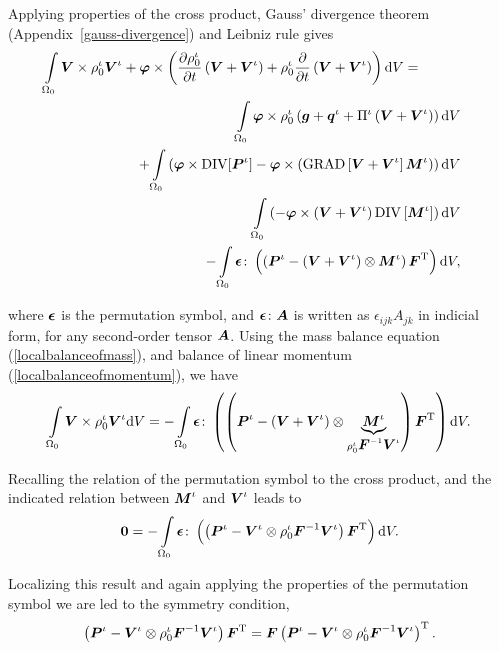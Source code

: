 \noindent Applying properties of the cross product, Gauss' divergence 
theorem (Appendix~\ref{gauss-divergence}) and Leibniz rule gives
\begin{eqnarray}
\int\limits_{\Omega_0}\mbox{\boldmath$ V$}\times\rho^\iota_0\mbox{\boldmath$ V$}^\iota +
\mbox{\boldmath$\varphi$}\times \left(\frac{\partial\rho^\iota_0}{\partial
t}\left(\mbox{\boldmath$ V$}+\mbox{\boldmath$ V$}^\iota\right)+ \rho^\iota_0\frac{\partial}{\partial
t}\left(\mbox{\boldmath$ V$}+\mbox{\boldmath$ V$}^\iota\right)\right)\mathrm{d}V =\qquad\quad& &\nonumber\\
\int\limits_{\Omega_0}\mbox{\boldmath$\varphi$}\times\rho^\iota_0
\left(\mbox{\boldmath$ g$}+\mbox{\boldmath$ q$}^\iota+\Pi^\iota\left(\mbox{\boldmath$ V$}+\mbox{\boldmath$ V$}^\iota\right)\right)\mathrm{d}V&
&\nonumber\\ 
 +
\int\limits_{\Omega_0}\left(\mbox{\boldmath$\varphi$}\times\mathrm{DIV}[\mbox{\boldmath$ P$}^\iota] -
\mbox{\boldmath$\varphi$}\times\left(\mathrm{GRAD}
\left[\mbox{\boldmath$ V$}+\mbox{\boldmath$ V$}^\iota\right]\mbox{\boldmath$ M$}^\iota\right)\right)\mathrm{d}V &
&\nonumber\\
\int\limits_{\Omega_0}\left(-\mbox{\boldmath$\varphi$}\times\left(\mbox{\boldmath$ V$}+\mbox{\boldmath$ V$}^\iota\right)
\mathrm{DIV}\left[\mbox{\boldmath$ M$}^\iota\right]\right) 
\mathrm{d}V & &\nonumber\\
-
\int\limits_{\Omega_0}\mbox{\boldmath$\epsilon$}\colon\left(\left(\mbox{\boldmath$ P$}^\iota -
\left(\mbox{\boldmath$ V$}+\mbox{\boldmath$ V$}^\iota\right) \otimes\mbox{\boldmath$ M$}^\iota\right)
\mbox{\boldmath$ F$}^\mathrm{T}\right) \mathrm{d}V,
\end{eqnarray}

\noindent where $\mbox{\boldmath$\epsilon$}$ is the permutation symbol, and
$\mbox{\boldmath$\epsilon$}\colon\mbox{\boldmath$ A$}$ is written as $\epsilon_{ijk}A_{jk}$ in
indicial form, for any second-order tensor $\mbox{\boldmath$ A$}$. Using the mass
balance equation (\ref{localbalanceofmass}), and balance of linear
momentum (\ref{localbalanceofmomentum}), we have
\begin{displaymath}
\int\limits_{\Omega_0}\mbox{\boldmath$ V$}\times\rho^\iota_0\mbox{\boldmath$ V$}^\iota\mathrm{d}V =
-\int\limits_{\Omega_0}\mbox{\boldmath$\epsilon$}\colon
\left(\left(\mbox{\boldmath$ P$}^\iota-\left(\mbox{\boldmath$ V$}+\mbox{\boldmath$ V$}^\iota\right)
\otimes\underbrace{\mbox{\boldmath$ M$}^\iota}_{\rho_0^\iota\mbox{\boldmath$ F$}^{-1}\mbox{\boldmath$ V$}^\iota}\right)
\mbox{\boldmath$ F$}^\mathrm{T}\right)\mathrm{d}V. 
\end{displaymath}

\noindent Recalling the relation of the permutation symbol to the
cross product, and the indicated relation between $\mbox{\boldmath$ M$}^\iota$ and
$\mbox{\boldmath$ V$}^\iota$ leads to
\begin{equation}
{\bf 0} =
-\int\limits_{\Omega_0}\mbox{\boldmath$\epsilon$}\colon\left(\left(\mbox{\boldmath$ P$}^\iota-\mbox{\boldmath$ V$}^\iota
\otimes \rho_0^\iota\mbox{\boldmath$ F$}^{-1}\mbox{\boldmath$ V$}^\iota\right)
\mbox{\boldmath$ F$}^\mathrm{T}\right)\mathrm{d}V.
\end{equation}

\noindent Localizing this result and again applying the properties
of the permutation symbol we are led to the symmetry condition,
\begin{equation}
\left(\mbox{\boldmath$ P$}^\iota-\mbox{\boldmath$ V$}^\iota\otimes\rho^\iota_0\mbox{\boldmath$ F$}^{-1}\mbox{\boldmath$ V$}^\iota\right)
\mbox{\boldmath$ F$}^\mathrm{T} = \mbox{\boldmath$ F$}\left(\mbox{\boldmath$ P$}^\iota-\mbox{\boldmath$ V$}^\iota \otimes
\rho^\iota_0\mbox{\boldmath$ F$}^{-1}\mbox{\boldmath$ V$}^\iota\right)^\mathrm{T}.
\label{localbalanceofangularmomentum}
\end{equation}

